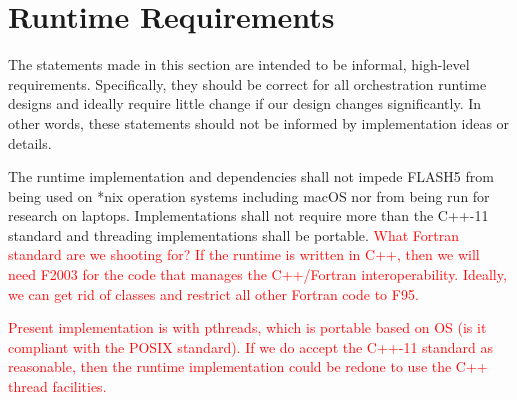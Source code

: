 \documentclass{article}
\begin{document}
%
%
%
%

\section{Runtime Requirements}
The statements made in this section are intended to be informal, high-level
requirements.  Specifically, they should be correct for all orchestration
runtime designs and ideally require little change if our design changes
significantly.  In other words, these statements should not be informed by
implementation ideas or details.

\begin{req}
The runtime implementation and dependencies shall not impede FLASH5 from being
used on *nix operation systems including macOS nor from being run for research
on laptops.  Implementations shall not require more than the C++-11 standard and
threading implementations shall be portable.  \textcolor{red}{What Fortran
standard are we shooting for?  If the runtime is written in C++, then we will
need F2003 for the code that manages the C++/Fortran interoperability.  Ideally,
we can get rid of classes and restrict all other Fortran code to F95.}
\end{req}

\textcolor{red}{Present implementation is with pthreads, which is portable based
on OS (is it compliant with the POSIX standard).  If we do accept the C++-11
standard as reasonable, then the runtime implementation could be redone to use
the C++ thread facilities.}\\
\end{document}

